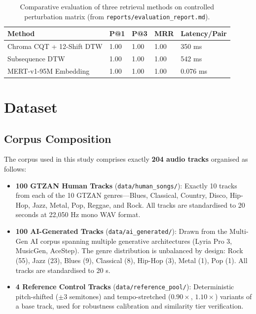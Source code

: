 \documentclass[12pt,a4paper]{article}
\begin{document}
\renewcommand{\arraystretch}{1.2}
\begin{table}[H]
\centering
\caption{Comparative evaluation of three retrieval methods on controlled perturbation matrix (from \texttt{reports/evaluation\_report.md}).}
\label{tab:retrieval_comparison}
\begin{tabularx}{\textwidth}{|l|X|X|X|X|}
\hline
\textbf{Method} & \textbf{P@1} & \textbf{P@3} & \textbf{MRR} & \textbf{Latency/Pair} \\
\hline
Chroma CQT + 12-Shift DTW & 1.00 & 1.00 & 1.00 & 350 ms \\
\hline
Subsequence DTW & 1.00 & 1.00 & 1.00 & 542 ms \\
\hline
MERT-v1-95M Embedding & 1.00 & 1.00 & 1.00 & 0.076 ms \\
\hline
\end{tabularx}
\end{table}

\section{Dataset}
\label{sec:dataset}

\subsection{Corpus Composition}

The corpus used in this study comprises exactly \textbf{204 audio tracks}
organised as follows:

\begin{itemize}[noitemsep]
  \item \textbf{100 GTZAN Human Tracks} (\texttt{data/human\_songs/}):
        Exactly 10 tracks from each of the 10 GTZAN genres---Blues, Classical,
        Country, Disco, Hip-Hop, Jazz, Metal, Pop, Reggae, and Rock. All tracks
        are standardised to 20 seconds at 22,050 Hz mono WAV format.
  \item \textbf{100 AI-Generated Tracks} (\texttt{data/ai\_generated/}):
        Drawn from the Multi-Gen AI corpus spanning multiple generative
        architectures (Lyria Pro 3, MusicGen, AceStep). The genre distribution
        is unbalanced by design: Rock (55), Jazz (23), Blues (9), Classical (8),
        Hip-Hop (3), Metal (1), Pop (1). All tracks are standardised to 20 s.
  \item \textbf{4 Reference Control Tracks} (\texttt{data/reference\_pool/}):
        Deterministic pitch-shifted ($\pm 3$ semitones) and tempo-stretched
        ($0.90\times$, $1.10\times$) variants of a base track, used for
        robustness calibration and similarity tier verification.
\end{itemize}
\end{document}
